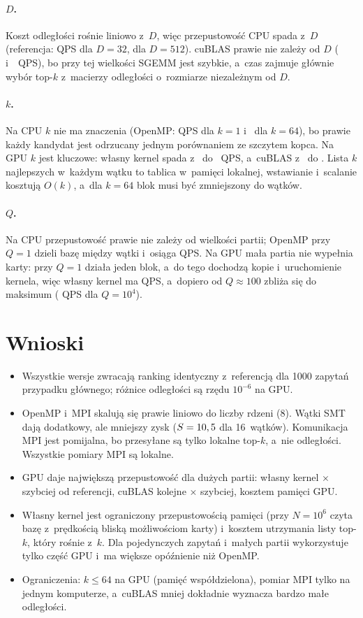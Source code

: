 \documentclass[11pt,a4paper]{article}
\begin{document}
\paragraph{$D$.} Koszt odległości rośnie liniowo z~$D$, więc przepustowość CPU spada z~$D$ (referencja:  QPS dla $D=32$,  dla $D=512$). cuBLAS prawie nie zależy od $D$ (\cublasQpsDmin{} i~\cublasQpsDmax~QPS), bo przy tej wielkości SGEMM jest szybkie, a~czas zajmuje głównie wybór top-$k$ z~macierzy odległości o~rozmiarze niezależnym od $D$.

\paragraph{$k$.} Na CPU $k$ nie ma znaczenia (OpenMP: \ompQpsKmin{} QPS dla $k=1$ i~\ompQpsKmax{} dla $k=64$), bo prawie każdy kandydat jest odrzucany jednym porównaniem ze szczytem kopca. Na GPU $k$ jest kluczowe: własny kernel spada z~\cudaQpsKmin{} do \cudaQpsKmax~QPS, a~cuBLAS z~\cublasQpsKmin{} do \cublasQpsKmax. Lista $k$ najlepszych w~każdym wątku to tablica w~pamięci lokalnej, wstawianie i~scalanie kosztują $O(k)$, a~dla $k=64$ blok musi być zmniejszony do \cudaBlokKmax{} wątków.

\paragraph{$Q$.} Na CPU przepustowość prawie nie zależy od wielkości partii; OpenMP przy $Q=1$ dzieli bazę między wątki i~osiąga \ompQpsQjeden{} QPS. Na GPU mała partia nie wypełnia karty: przy $Q=1$ działa jeden blok, a~do tego dochodzą kopie i~uruchomienie kernela, więc własny kernel ma \cudaQpsQmin{} QPS, a~dopiero od $Q\approx100$ zbliża się do maksimum (\cudaQpsQmax{} QPS dla $Q=10^4$).

\section{Wnioski}
\begin{itemize}
\item Wszystkie wersje zwracają ranking identyczny z~referencją dla 1000 zapytań przypadku głównego; różnice odległości są rzędu $10^{-6}$ na GPU.
\item OpenMP i~MPI skalują się prawie liniowo do liczby rdzeni (8). Wątki SMT dają dodatkowy, ale mniejszy zysk ($S=10,5$ dla 16~wątków). Komunikacja MPI jest pomijalna, bo przesyłane są tylko lokalne top-$k$, a~nie odległości. Wszystkie pomiary MPI są lokalne.
\item GPU daje największą przepustowość dla dużych partii: własny kernel \cudaDoRef{}$\times$ szybciej od referencji, cuBLAS kolejne \cublasDoCuda{}$\times$ szybciej, kosztem pamięci GPU.
\item Własny kernel jest ograniczony przepustowością pamięci (przy $N=10^6$ czyta bazę z~prędkością bliską możliwościom karty) i~kosztem utrzymania listy top-$k$, który rośnie z~$k$. Dla pojedynczych zapytań i~małych partii wykorzystuje tylko część GPU i~ma większe opóźnienie niż OpenMP.
\item Ograniczenia: $k\le 64$ na GPU (pamięć współdzielona), pomiar MPI tylko na jednym komputerze, a~cuBLAS mniej dokładnie wyznacza bardzo małe odległości.
\end{itemize}
\end{document}
